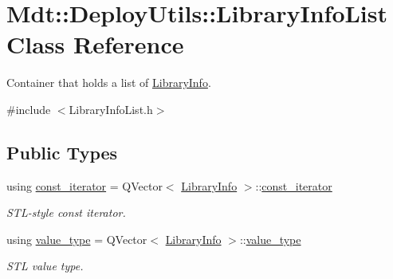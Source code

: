 \hypertarget{class_mdt_1_1_deploy_utils_1_1_library_info_list}{}\section{Mdt\+:\+:Deploy\+Utils\+:\+:Library\+Info\+List Class Reference}
\label{class_mdt_1_1_deploy_utils_1_1_library_info_list}


Container that holds a list of \hyperlink{class_mdt_1_1_deploy_utils_1_1_library_info}{Library\+Info}.  




{\ttfamily \#include $<$Library\+Info\+List.\+h$>$}

\subsection*{Public Types}
\begin{DoxyCompactItemize}
\item 
using \hyperlink{class_mdt_1_1_deploy_utils_1_1_library_info_list_a07338b20f243a1c7fcb3f696a35ddd44}{const\+\_\+iterator} = Q\+Vector$<$ \hyperlink{class_mdt_1_1_deploy_utils_1_1_library_info}{Library\+Info} $>$\+::\hyperlink{class_mdt_1_1_deploy_utils_1_1_library_info_list_a07338b20f243a1c7fcb3f696a35ddd44}{const\+\_\+iterator}\hypertarget{class_mdt_1_1_deploy_utils_1_1_library_info_list_a07338b20f243a1c7fcb3f696a35ddd44}{}\label{class_mdt_1_1_deploy_utils_1_1_library_info_list_a07338b20f243a1c7fcb3f696a35ddd44}

\begin{DoxyCompactList}\small\item\em S\+T\+L-\/style const iterator. \end{DoxyCompactList}\item 
using \hyperlink{class_mdt_1_1_deploy_utils_1_1_library_info_list_afcdf2c32ca02273dd257814517b691e8}{value\+\_\+type} = Q\+Vector$<$ \hyperlink{class_mdt_1_1_deploy_utils_1_1_library_info}{Library\+Info} $>$\+::\hyperlink{class_mdt_1_1_deploy_utils_1_1_library_info_list_afcdf2c32ca02273dd257814517b691e8}{value\+\_\+type}\hypertarget{class_mdt_1_1_deploy_utils_1_1_library_info_list_afcdf2c32ca02273dd257814517b691e8}{}\label{class_mdt_1_1_deploy_utils_1_1_library_info_list_afcdf2c32ca02273dd257814517b691e8}

\begin{DoxyCompactList}\small\item\em S\+TL value type. \end{DoxyCompactList}\end{DoxyCompactItemize}
